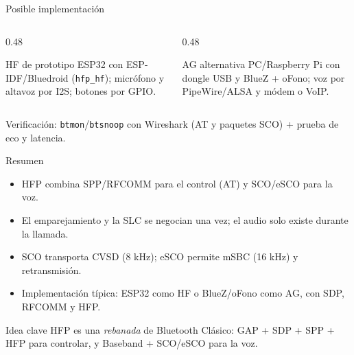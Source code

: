 \documentclass[aspectratio=169,10pt]{beamer}
\begin{document}
\begin{frame}{Posible implementación}
  \begin{columns}[T,onlytextwidth]
    \begin{column}{0.48\textwidth}
      \begin{block}{HF de prototipo}
        \footnotesize ESP32 con ESP-IDF/Bluedroid (\texttt{hfp\_hf}); micrófono y altavoz por I2S; botones por GPIO.
      \end{block}
    \end{column}
    \begin{column}{0.48\textwidth}
      \begin{block}{AG alternativa}
        \footnotesize PC/Raspberry Pi con dongle USB y BlueZ + oFono; voz por PipeWire/ALSA y módem o VoIP.
      \end{block}
    \end{column}
  \end{columns}
  \vspace{3mm}
  \begin{center}
  \end{center}
  \vspace{2mm}
  \footnotesize
  Verificación: \texttt{btmon}/\texttt{btsnoop} con Wireshark (AT y paquetes SCO) + prueba de eco y latencia.
\end{frame}

\begin{frame}{Resumen}
  \begin{itemize}
    \item HFP combina \alert{SPP/RFCOMM} para el control (AT) y \alert{SCO/eSCO} para la voz.
    \item El emparejamiento y la SLC se negocian una vez; el audio solo existe durante la llamada.
    \item SCO transporta CVSD (8 kHz); eSCO permite mSBC (16 kHz) y retransmisión.
    \item Implementación típica: ESP32 como HF o BlueZ/oFono como AG, con SDP, RFCOMM y HFP.
  \end{itemize}
  \vspace{4mm}
  \begin{block}{Idea clave}
    \footnotesize HFP es una \emph{rebanada} de Bluetooth Clásico: GAP + SDP + SPP + HFP para controlar, y Baseband + SCO/eSCO para la voz.
  \end{block}
\end{frame}
\end{document}
